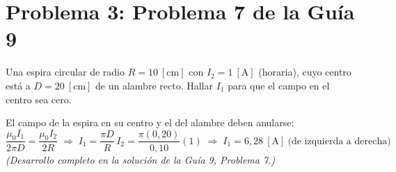 \documentclass[12pt,letterpaper]{article}
\begin{document}
\vspace{0.7cm}

\section*{Problema 3: Problema 7 de la Gu\'ia 9}

\noindent Una espira circular de radio $R = 10\ [\text{cm}]$ con $I_2 = 1\ [\text{A}]$ (horaria),
cuyo centro est\'a a $D = 20\ [\text{cm}]$ de un alambre recto. Hallar $I_1$ para que el campo en
el centro sea cero.

\medskip

\noindent El campo de la espira en su centro y el del alambre deben anularse:
\[
    \frac{\mu_0 I_1}{2\pi D} = \frac{\mu_0 I_2}{2R}
    \;\Rightarrow\;
    I_1 = \frac{\pi D}{R}\,I_2 = \frac{\pi(0{,}20)}{0{,}10}(1)
    \;\Rightarrow\; \boxed{I_1 = 6{,}28\ [\text{A}]\ \text{(de izquierda a derecha)}}
\]
\noindent\small\textit{(Desarrollo completo en la soluci\'on de la Gu\'ia 9, Problema 7.)}\normalsize
\end{document}
